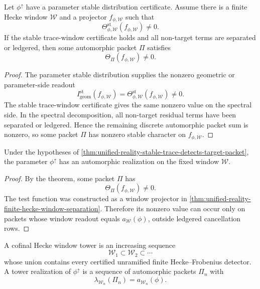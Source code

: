 \begin{theorem}
\label{thm:unified-reality-stable-trace-detects-target-packet}
Let $\phi^{\uparrow}$ have a parameter stable distribution certificate.
Assume there is a finite Hecke window $\mathcal W$ and a projector
$f_{\phi,\mathcal W}$ such that
$$
\Theta_{\phi,\mathcal W}^{\mathrm{st}}(f_{\phi,\mathcal W})\ne0.
$$
If the stable trace-window certificate holds and all non-target terms are
separated or ledgered, then some automorphic packet $\Pi$ satisfies
$$
\Theta_{\Pi}(f_{\phi,\mathcal W})\ne0.
$$
\end{theorem}
\begin{proof}
The parameter stable distribution supplies the nonzero geometric or
parameter-side readout
$$
I_{\mathrm{geom}}^{\mathrm{st}}(f_{\phi,\mathcal W})
=
\Theta_{\phi,\mathcal W}^{\mathrm{st}}(f_{\phi,\mathcal W})
\ne0.
$$
The stable trace-window certificate gives the same nonzero value on the
spectral side. In the spectral decomposition, all non-target residual
terms have been separated or ledgered. Hence the remaining discrete
automorphic packet sum is nonzero, so some packet $\Pi$ has nonzero
stable character on $f_{\phi,\mathcal W}$.
\end{proof}

\begin{corollary}
\label{cor:unified-reality-fixed-window-automorphic-realization}
Under the hypotheses of
\autoref{thm:unified-reality-stable-trace-detects-target-packet}, the
parameter $\phi^{\uparrow}$ has an automorphic realization on the fixed
window $\mathcal W$.
\end{corollary}
\begin{proof}
By the theorem, some packet $\Pi$ has
$$
\Theta_{\Pi}(f_{\phi,\mathcal W})\ne0.
$$
The test function was constructed as a window projector in
\autoref{thm:unified-reality-finite-hecke-window-separation}. Therefore
its nonzero value can occur only on packets whose window readout equals
$a_{\mathcal W}(\phi)$, outside ledgered cancellation rows.
\end{proof}

\begin{definition}
\label{def:unified-reality-cofinal-hecke-window-tower}
A cofinal Hecke window tower is an increasing sequence
$$
\mathcal W_1\subset\mathcal W_2\subset\cdots
$$
whose union contains every certified unramified finite
Hecke--Frobenius detector. A tower realization of $\phi^{\uparrow}$ is a
sequence of automorphic packets $\Pi_n$ with
$$
\lambda_{\mathcal W_n}(\Pi_n)=a_{\mathcal W_n}(\phi).
$$
\end{definition}

